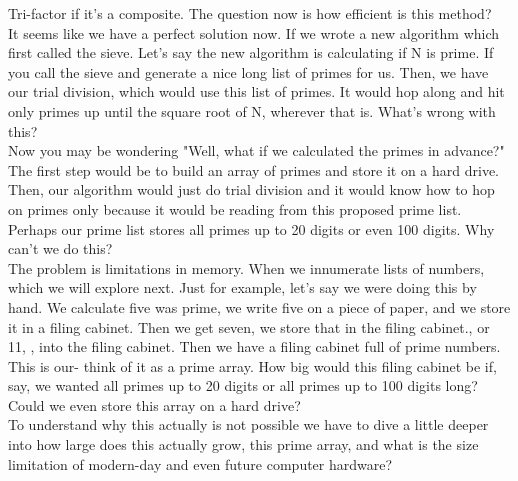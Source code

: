 \documentclass{report}
\begin{document}
Tri-factor if it's a composite. The question now is how efficient is this method?\\
It seems like we have a perfect solution now. If we wrote a new algorithm which first called the sieve. Let's say the new algorithm is calculating if N is prime. If you call the sieve and generate a nice long list of primes for us. Then, we have our trial division, which would use this list of primes. It would hop along and hit only primes up until the square root of N, wherever that is. What's wrong with this? \\
 Now you may be wondering "Well, what if we calculated the primes in advance?" The first step would be to build an array of primes and store it on a hard drive. Then, our algorithm would just do trial division and it would know how to hop on primes only because it would be reading from this proposed prime list. Perhaps our prime list stores all primes up to 20 digits or even 100 digits. Why can't we do this? \\
The problem is limitations in memory. When we innumerate lists of numbers, which we will explore next. Just for example, let's say we were doing this by hand. We calculate five was prime, we write five on a piece of paper, and we store it in a filing cabinet. Then we get seven, we store that in the filing cabinet., or 11, , into the filing cabinet. Then we have a filing cabinet full of prime numbers. This is our- think of it as a prime array. How big would this filing cabinet be if, say, we wanted all primes up to 20 digits or all primes up to 100 digits long? Could we even store this array on a hard drive? \\
To understand why this actually is not possible we have to dive a little deeper into how large does this actually grow, this prime array, and what is the size limitation of modern-day and even future computer hardware?
\end{document}
